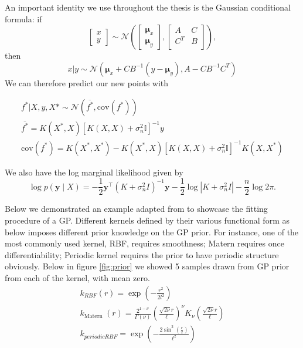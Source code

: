 \documentclass{statsmsc}
\begin{document}
An important identity we use throughout the thesis is the Gaussian conditional formula: if
$$
  \begin{bmatrix}
    x\\y
  \end{bmatrix} 
  \sim \mathcal{N}
  \left(
    \begin{bmatrix}
      \mathbf{\mu}_x\\
      \mathbf{\mu}_y
    \end{bmatrix},
    \begin{bmatrix}
      A & C \\
      C^T & B\\
    \end{bmatrix}
  \right), 
$$ 
then 
\begin{equation}
  x|y\sim \mathcal{N}\left(\mathbf{\mu}_x+CB^{-1}(y-\mathbf{\mu}_y),A-CB^{-1}C^T\right)
  \label{equ:normal_condtion}
\end{equation}
We can therefore predict our new points with 

\begin{equation*}
\begin{gathered}
f^*|X, y, X* \sim \mathcal{N} \left(\overline{f^*}, \mathrm{cov}(f^*)\right)\\ 
\overline{f^*} = K(X^*, X)[K(X,X)+\sigma^2_n\mathbb{I}]^{-1}y\\
\mathrm{cov}(f^*) = K(X^*, X^*) - K(X^*, X)[K(X, X)+\sigma^2_n\mathbb{I}]^{-1}K(X, X^*)
\end{gathered}
\end{equation*}

We also have the log marginal likelihood given by 
$$
\log p(\mathbf{y} \mid X)=-\frac{1}{2} \mathbf{y}^{\top}\left(K+\sigma_{n}^{2} I\right)^{-1} \mathbf{y}-\frac{1}{2} \log \left|K+\sigma_{n}^{2} I\right|-\frac{n}{2} \log 2 \pi.
$$

Below we demonstrated an example adapted from \cite{GPflow2017} to showcase the fitting procedure of a GP.
Different kernels defined by their various functional form as below imposes different prior knowledge on the GP prior.
For instance, one of the most commonly used kernel, RBF, requires smoothness; Matern requires once differentiability; Periodic kernel requires the prior to have periodic structure obviously.
Below in figure \ref{fig:prior} we showed 5 samples drawn from GP prior from each of the kernel, with mean zero.
\begin{equation*}
  \begin{gathered}
    k_{RBF}(r) = \exp(-\frac{r^2}{2l^2}) \\
    k_{\text {Matern }}(r)=\frac{2^{1-\nu}}{\Gamma(\nu)}\left(\frac{\sqrt{2 \nu} r}{\ell}\right)^{\nu} K_{\nu}\left(\frac{\sqrt{2 \nu} r}{\ell}\right) \\
    k_{periodic RBF}=\exp \left(-\frac{2 \sin ^{2}\left(\frac{r}{2}\right)}{\ell^{2}}\right)
  \end{gathered}
\end{equation*}
\end{document}
